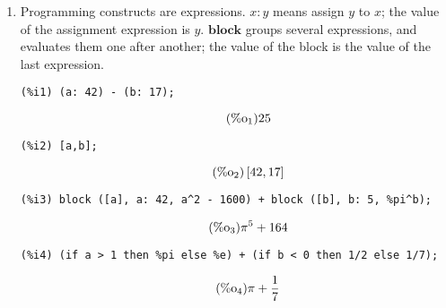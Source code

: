 \documentclass[12pt,leqno]{article}
\begin{document}
\begin{enumerate}
\begin{equation}
\begin{bmatrix}
\left[\pi, 17\right] & a d-b c\\
\begin{bmatrix}
1 & a\\
b & 7\\
\end{bmatrix}
 & e\\
\end{bmatrix}
\label{eq:doc-group1-code8-6-1}
\end{equation}
\begin{verbatim}
(%i7) M [2][1];
\end{verbatim}
\begin{equation}
\tag{$\mathop{\mathrm{\%o}_{7}}$}29
\label{eq:doc-group1-code8-7-1}
\end{equation}
\begin{verbatim}
(%i8) M2 [2][1];
\end{verbatim}
\begin{equation}
\tag{$\mathop{\mathrm{\%o}_{8}}$}\begin{bmatrix}
1 & a\\
b & 7\\
\end{bmatrix}
\label{eq:doc-group1-code8-8-1}
\end{equation}


\item Programming constructs are expressions.
$x : y$ means assign $y$ to $x$; the value of the assignment expression is $y$.
$\mathbf{block}$ groups several expressions, and evaluates them one after another;
the value of the block is the value of the last expression.
\begin{verbatim}
(%i1) (a: 42) - (b: 17);
\end{verbatim}
\begin{equation}
\tag{$\mathop{\mathrm{\%o}_{1}}$}25
\label{eq:doc-group1-code9-1-1}
\end{equation}
\begin{verbatim}
(%i2) [a,b];
\end{verbatim}
\begin{equation}
\tag{$\mathop{\mathrm{\%o}_{2}}$}\left[42, 17\right]
\label{eq:doc-group1-code9-2-1}
\end{equation}
\begin{verbatim}
(%i3) block ([a], a: 42, a^2 - 1600) + block ([b], b: 5, %pi^b);
\end{verbatim}
\begin{equation}
\tag{$\mathop{\mathrm{\%o}_{3}}$}{\pi}^{5}+164
\label{eq:doc-group1-code9-3-1}
\end{equation}
\begin{verbatim}
(%i4) (if a > 1 then %pi else %e) + (if b < 0 then 1/2 else 1/7);
\end{verbatim}
\begin{equation}
\tag{$\mathop{\mathrm{\%o}_{4}}$}\pi+\frac{1}{7}
\label{eq:doc-group1-code9-4-1}
\end{equation}



\end{enumerate}
\end{document}

